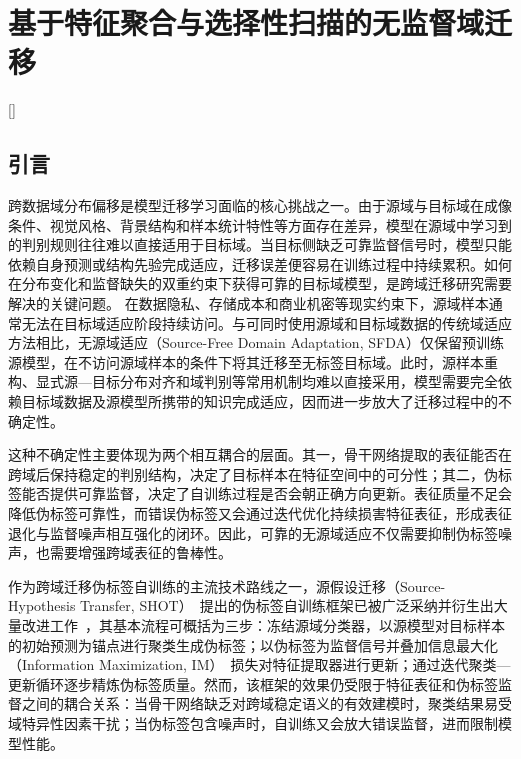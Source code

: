 
\chapter[基于特征聚合与选择性扫描的无监督域迁移]{基于特征聚合与选择性扫描的无监督域迁移}[]

\label{chap:2}


\section{引言}

跨数据域分布偏移是模型迁移学习面临的核心挑战之一。由于源域与目标域在成像条件、视觉风格、背景结构和样本统计特性等方面存在差异，模型在源域中学习到的判别规则往往难以直接适用于目标域。当目标侧缺乏可靠监督信号时，模型只能依赖自身预测或结构先验完成适应，迁移误差便容易在训练过程中持续累积。如何在分布变化和监督缺失的双重约束下获得可靠的目标域模型，是跨域迁移研究需要解决的关键问题。
在数据隐私、存储成本和商业机密等现实约束下，源域样本通常无法在目标域适应阶段持续访问。与可同时使用源域和目标域数据的传统域适应方法相比，无源域适应（Source-Free Domain Adaptation, SFDA）仅保留预训练源模型，在不访问源域样本的条件下将其迁移至无标签目标域。此时，源样本重构、显式源—目标分布对齐和域判别等常用机制均难以直接采用，模型需要完全依赖目标域数据及源模型所携带的知识完成适应，因而进一步放大了迁移过程中的不确定性。

这种不确定性主要体现为两个相互耦合的层面。其一，骨干网络提取的表征能否在跨域后保持稳定的判别结构，决定了目标样本在特征空间中的可分性；其二，伪标签能否提供可靠监督，决定了自训练过程是否会朝正确方向更新。表征质量不足会降低伪标签可靠性，而错误伪标签又会通过迭代优化持续损害特征表征，形成表征退化与监督噪声相互强化的闭环。因此，可靠的无源域适应不仅需要抑制伪标签噪声，也需要增强跨域表征的鲁棒性。


作为跨域迁移伪标签自训练的主流技术路线之一，源假设迁移（Source-Hypothesis Transfer, SHOT）~\cite{liang2021source}提出的伪标签自训练框架已被广泛采纳并衍生出大量改进工作~\cite{fan2021dda,wang2025osda}，其基本流程可概括为三步：冻结源域分类器，以源模型对目标样本的初始预测为锚点进行聚类生成伪标签；以伪标签为监督信号并叠加信息最大化（Information Maximization, IM）~\cite{gomes2010discriminative}损失对特征提取器进行更新；通过迭代聚类—更新循环逐步精炼伪标签质量。然而，该框架的效果仍受限于特征表征和伪标签监督之间的耦合关系：当骨干网络缺乏对跨域稳定语义的有效建模时，聚类结果易受域特异性因素干扰；当伪标签包含噪声时，自训练又会放大错误监督，进而限制模型性能。

